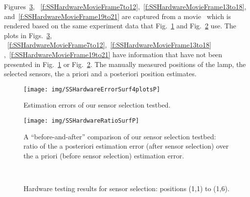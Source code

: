 Figures~\ref{f:SSHardwareMovieFrame1to6}, ~\ref{f:SSHardwareMovieFrame7to12},~\ref{f:SSHardwareMovieFrame13to18}, and~\ref{f:SSHardwareMovieFrame19to21} are captured from a movie~\cite{zhencossUrl}
which is rendered based on the same experiment data that Fig.~\ref{f:SSHardwareErrorSurf} and Fig.~\ref{f:SSHardwareRatioSurf} use. The plots in Figs.~\ref{f:SSHardwareMovieFrame1to6}, ~\ref{f:SSHardwareMovieFrame7to12},~\ref{f:SSHardwareMovieFrame13to18}
,~\ref{f:SSHardwareMovieFrame19to21} have information that have not been presented in Fig.~\ref{f:SSHardwareErrorSurf} or Fig.~\ref{f:SSHardwareRatioSurf}. The manually measured positions of the lamp, the selected sensors, the a priori and a posteriori position estimates.


\begin{figure}
  \centering
  \texttt{[image: img/SSHardwareErrorSurf4plotsP]}
\caption{Estimation errors of our sensor selection testbed.}\label{f:SSHardwareErrorSurf}
\end{figure}


\begin{figure}
  \centering
  \texttt{[image: img/SSHardwareRatioSurfP]}
\caption{A ``before-and-after'' comparison of our sensor selection testbed: ratio of the a posteriori estimation error (after sensor selection) over the a priori (before sensor selection) estimation error.}\label{f:SSHardwareRatioSurf}
\end{figure}





\begin{figure}[!h]
  \centering
    \mbox{
       
      }
    \mbox{
       
      }
    \mbox{
       
      }
    \caption{Hardware testing results for sensor selection: positions (1,1) to (1,6).}
    \label{f:SSHardwareMovieFrame1to6}
\end{figure}


